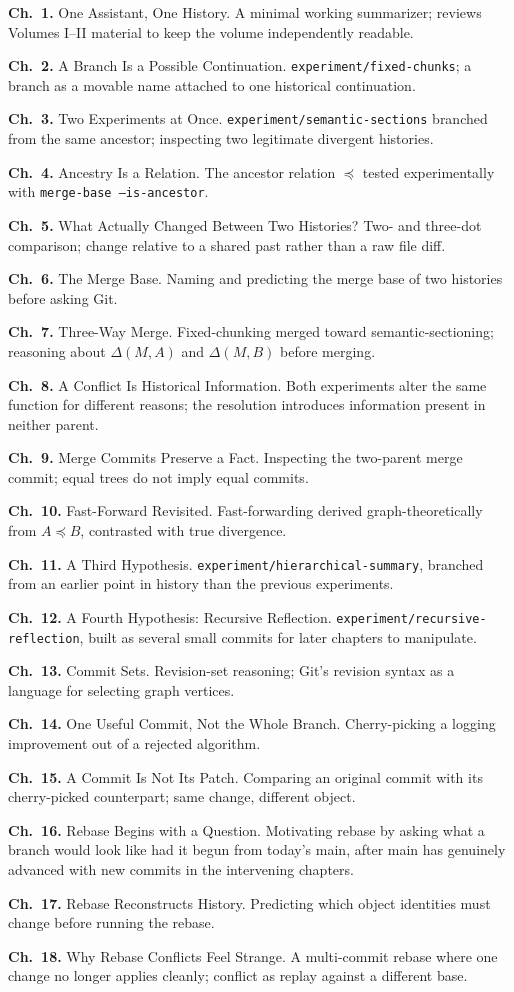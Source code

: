 \documentclass[11pt]{book}
\newcommand{\subheading}[1]{\bigskip\noindent{\bfseries\itshape #1}\smallskip\par}
\newcommand{\chapentry}[2]{\noindent\textbf{Ch.~#1.} #2\par\smallskip}
\begin{document}
\subheading{Chapter Outline}
\chapentry{1}{One Assistant, One History. A minimal working summarizer; reviews Volumes I--II material to keep the volume independently readable.}
\chapentry{2}{A Branch Is a Possible Continuation. \texttt{experiment/fixed-chunks}; a branch as a movable name attached to one historical continuation.}
\chapentry{3}{Two Experiments at Once. \texttt{experiment/semantic-sections} branched from the same ancestor; inspecting two legitimate divergent histories.}
\chapentry{4}{Ancestry Is a Relation. The ancestor relation $\preceq$ tested experimentally with \texttt{merge-base --is-ancestor}.}
\chapentry{5}{What Actually Changed Between Two Histories? Two- and three-dot comparison; change relative to a shared past rather than a raw file diff.}
\chapentry{6}{The Merge Base. Naming and predicting the merge base of two histories before asking Git.}
\chapentry{7}{Three-Way Merge. Fixed-chunking merged toward semantic-sectioning; reasoning about $\Delta(M,A)$ and $\Delta(M,B)$ before merging.}
\chapentry{8}{A Conflict Is Historical Information. Both experiments alter the same function for different reasons; the resolution introduces information present in neither parent.}
\chapentry{9}{Merge Commits Preserve a Fact. Inspecting the two-parent merge commit; equal trees do not imply equal commits.}
\chapentry{10}{Fast-Forward Revisited. Fast-forwarding derived graph-theoretically from $A \preceq B$, contrasted with true divergence.}
\chapentry{11}{A Third Hypothesis. \texttt{experiment/hierarchical-summary}, branched from an earlier point in history than the previous experiments.}
\chapentry{12}{A Fourth Hypothesis: Recursive Reflection. \texttt{experiment/recursive-reflection}, built as several small commits for later chapters to manipulate.}
\chapentry{13}{Commit Sets. Revision-set reasoning; Git's revision syntax as a language for selecting graph vertices.}
\chapentry{14}{One Useful Commit, Not the Whole Branch. Cherry-picking a logging improvement out of a rejected algorithm.}
\chapentry{15}{A Commit Is Not Its Patch. Comparing an original commit with its cherry-picked counterpart; same change, different object.}
\chapentry{16}{Rebase Begins with a Question. Motivating rebase by asking what a branch would look like had it begun from today's main, after main has genuinely advanced with new commits in the intervening chapters.}
\chapentry{17}{Rebase Reconstructs History. Predicting which object identities must change before running the rebase.}
\chapentry{18}{Why Rebase Conflicts Feel Strange. A multi-commit rebase where one change no longer applies cleanly; conflict as replay against a different base.}
\end{document}
